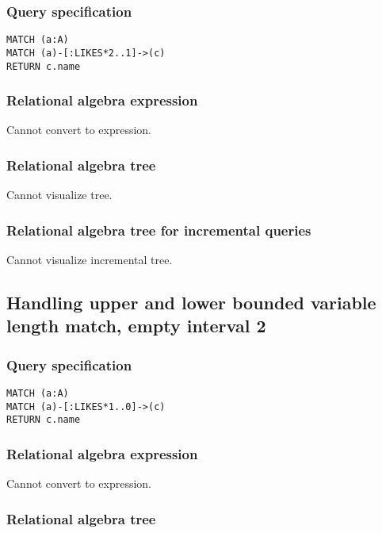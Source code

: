 \subsubsection*{Query specification}

\begin{lstlisting}
MATCH (a:A)
MATCH (a)-[:LIKES*2..1]->(c)
RETURN c.name
\end{lstlisting}

\subsubsection*{Relational algebra expression}

Cannot convert to expression.

\subsubsection*{Relational algebra tree}

Cannot visualize tree.

\subsubsection*{Relational algebra tree for incremental queries}

Cannot visualize incremental tree.

\subsection{Handling upper and lower bounded variable length match, empty interval 2}

\subsubsection*{Query specification}

\begin{lstlisting}
MATCH (a:A)
MATCH (a)-[:LIKES*1..0]->(c)
RETURN c.name
\end{lstlisting}

\subsubsection*{Relational algebra expression}

Cannot convert to expression.

\subsubsection*{Relational algebra tree}

